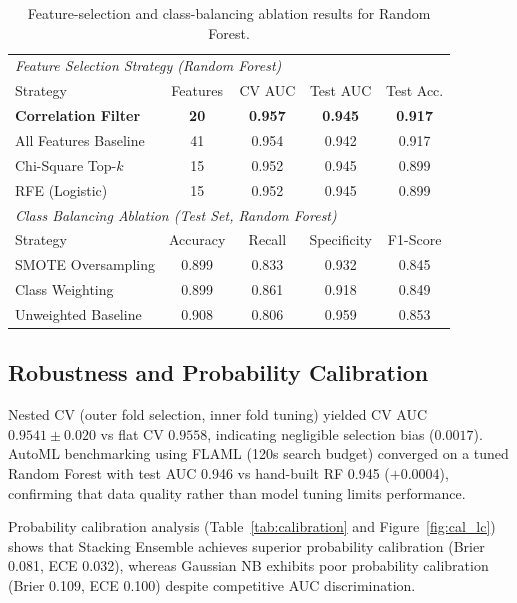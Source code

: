 \documentclass[10pt,twocolumn,a4paper]{article}
\begin{document}
\begin{table}[htbp]
\centering
\caption{Feature-selection and class-balancing ablation results for Random Forest.}
\label{tab:fsel}
\vspace{2pt}
\setlength{\tabcolsep}{2.5pt}
\small
\begin{tabular}{@{}l c c c c@{}}
\toprule
\multicolumn{5}{l}{\textit{Feature Selection Strategy (Random Forest)}} \\
Strategy & Features & CV AUC & Test AUC & Test Acc. \\
\midrule
\textbf{Correlation Filter} & \textbf{20} & \textbf{0.957} & \textbf{0.945} & \textbf{0.917} \\
All Features Baseline       & 41          & 0.954          & 0.942          & 0.917 \\
Chi-Square Top-$k$          & 15          & 0.952          & 0.945          & 0.899 \\
RFE (Logistic)              & 15          & 0.952          & 0.945          & 0.899 \\
\midrule
\multicolumn{5}{l}{\textit{Class Balancing Ablation (Test Set, Random Forest)}} \\
Strategy & Accuracy & Recall & Specificity & F1-Score \\
\midrule
SMOTE Oversampling  & 0.899 & 0.833 & 0.932 & 0.845 \\
Class Weighting     & 0.899 & 0.861 & 0.918 & 0.849 \\
Unweighted Baseline & 0.908 & 0.806 & 0.959 & 0.853 \\
\bottomrule
\end{tabular}
\end{table}

\subsection{Robustness and Probability Calibration}
Nested CV (outer fold selection, inner fold tuning) yielded CV AUC $0.9541 \pm 0.020$ vs flat CV $0.9558$, indicating negligible selection bias ($0.0017$).
AutoML benchmarking using FLAML (120s search budget) converged on a tuned Random Forest with test AUC 0.946 vs hand-built RF 0.945 ($+0.0004$),
confirming that data quality rather than model tuning limits performance.

Probability calibration analysis (Table~\ref{tab:calibration} and Figure~\ref{fig:cal_lc}) shows that Stacking Ensemble achieves superior probability calibration
(Brier 0.081, ECE 0.032), whereas Gaussian NB exhibits poor probability calibration (Brier 0.109, ECE 0.100) despite competitive AUC discrimination.
\end{document}
